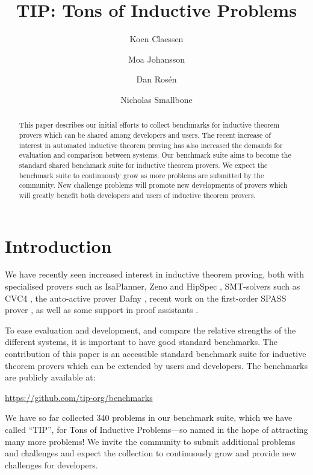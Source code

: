 \documentclass{llncs}
\begin{document}
\title{TIP: Tons of Inductive Problems}

\author{Koen Claessen \and Moa Johansson \and Dan Ros\'en \and Nicholas Smallbone}

\titlerunning{}

\maketitle

\begin{abstract} This paper describes our initial efforts to 
collect benchmarks for inductive theorem provers which can be 
shared among developers and users. The recent increase of 
interest in automated inductive theorem proving has also 
increased the demands for evaluation and comparison between 
systems. Our benchmark suite aims to become the standard shared 
benchmark suite for inductive theorem provers. We expect the 
benchmark suite to continuously grow as more problems are 
submitted by the community. New challenge problems will promote 
new developments of provers which will greatly benefit both 
developers and users of inductive theorem provers. 
\end{abstract}

\section{Introduction}

We have recently seen increased interest in inductive theorem 
proving, both with specialised provers such as IsaPlanner, Zeno 
and HipSpec \cite{hipspecCADE,dixon2007isaplanner,zeno}, 
SMT-solvers such as CVC4 \cite{cvc4}, the auto-active prover 
Dafny \cite{dafny}, recent work on the first-order SPASS prover 
\cite{SPASSInduction}, as well as some support in proof 
assistants \cite{hipster,acl2}.

To ease evaluation and development, and compare the relative 
strengths of the different systems, it is important to have good 
standard benchmarks. The contribution of this paper is an 
accessible standard benchmark suite for inductive theorem 
provers which can be extended by users and developers. The 
benchmarks are publicly available at:
\begin{center}
\url{https://github.com/tip-org/benchmarks}
\end{center}
We have so far collected 340 problems in our benchmark suite,
which we have called ``TIP'', for Tons of Inductive Problems---so
named in the hope of attracting many more problems! We invite the
community to submit additional problems and challenges and expect the
collection to continuously grow and provide new challenges for
developers.
\end{document}
